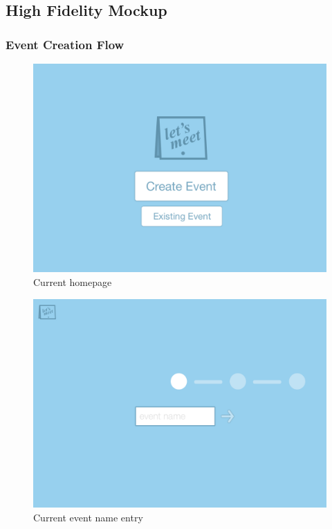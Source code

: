\documentclass{sigchi}
\begin{document}
\subsection{High Fidelity Mockup}

\subsubsection{Event Creation Flow}
\begin{figure}
  \centering
  \includegraphics[width=1.75\columnwidth]{Mockup/Home}
  \caption{Current homepage}
\end{figure}

\begin{figure}
  \centering
  \includegraphics[width=1.75\columnwidth]{Mockup/EventName}
  \caption{Current event name entry}
\end{figure}
\end{document}
